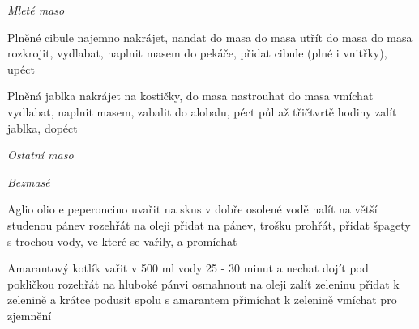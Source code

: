 \documentclass[12pt,a4paper]{article}
\begin{document}
\vspace*{\fill}
\hfill {\Huge\it Mleté maso}\hfill
\vspace*{\fill}
\newpage

\begin{recipe}{Plněné cibule}
   najemno nakrájet, nandat do masa
   do masa
   utřít do masa
   do masa
   rozkrojit, vydlabat, naplnit masem
   do pekáče, přidat cibule (plné i vnitřky), upéct
\end{recipe}
\newpage

\begin{recipe}{Plněná jablka}
   nakrájet na kostičky, do masa
   nastrouhat do masa
   vmíchat
   vydlabat, naplnit masem, zabalit do alobalu, péct půl až třičtvrtě hodiny
   zalít jablka, dopéct
\end{recipe}
\newpage

\vspace*{\fill}
\hfill {\Huge\it Ostatní maso}\hfill
\vspace*{\fill}
\newpage

\vspace*{\fill}
\hfill {\Huge\it Bezmasé}\hfill
\vspace*{\fill}
\newpage

\begin{recipe}{Aglio olio e peperoncino}
   uvařit na skus v dobře osolené vodě
   nalít na větší studenou pánev
   rozehřát na oleji
   přidat na pánev, trošku prohřát, přidat špagety s trochou vody, ve které se vařily, a promíchat
\end{recipe}
\newpage

\begin{recipe}{Amarantový kotlík}
   vařit v 500 ml vody 25 - 30 minut a nechat dojít pod pokličkou
   rozehřát na hluboké pánvi
   osmahnout na oleji
   zalít zeleninu
   přidat k zelenině a krátce podusit
   spolu s amarantem přimíchat k zelenině
   vmíchat pro zjemnění
\end{recipe}
\newpage
\end{document}

